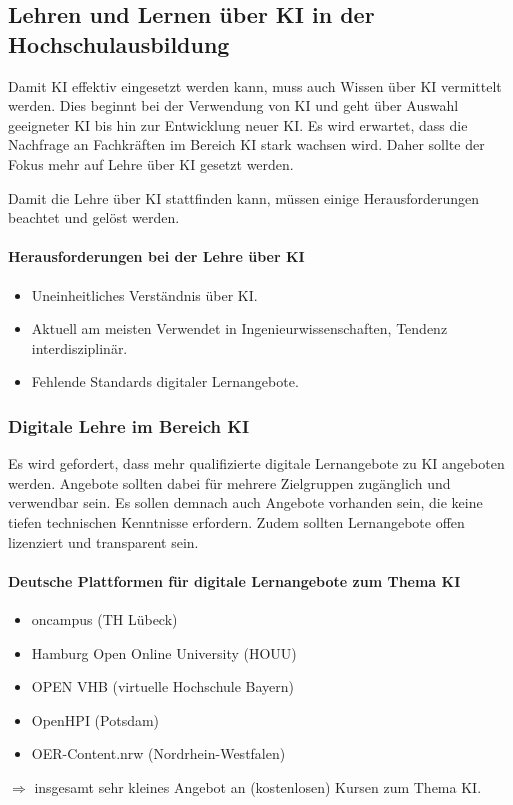 \subsection{Lehren und Lernen über KI in der Hochschulausbildung}
Damit KI effektiv eingesetzt werden kann, muss auch Wissen über KI vermittelt werden. Dies beginnt bei der Verwendung von KI und geht über Auswahl geeigneter KI bis hin zur Entwicklung neuer KI. Es wird erwartet, dass die Nachfrage an Fachkräften im Bereich KI stark wachsen wird. Daher sollte der Fokus mehr auf Lehre über KI gesetzt werden.

Damit die Lehre über KI stattfinden kann, müssen einige Herausforderungen beachtet und gelöst werden.

\paragraph*{Herausforderungen bei der Lehre über KI}
\begin{itemize}
    \item Uneinheitliches Verständnis über KI.
    \item Aktuell am meisten Verwendet in Ingenieurwissenschaften, Tendenz interdisziplinär.
    \item Fehlende Standards digitaler Lernangebote.
\end{itemize}

\subsubsection*{Digitale Lehre im Bereich KI}
Es wird gefordert, dass mehr qualifizierte digitale Lernangebote zu KI angeboten werden. Angebote sollten dabei für mehrere Zielgruppen zugänglich und verwendbar sein. Es sollen demnach auch Angebote vorhanden sein, die keine tiefen technischen Kenntnisse erfordern. Zudem sollten Lernangebote offen lizenziert und transparent sein.

\paragraph*{Deutsche Plattformen für digitale Lernangebote zum Thema KI}
\begin{itemize}
    \item oncampus (TH Lübeck)
    \item Hamburg Open Online University (HOUU)
    \item OPEN VHB (virtuelle Hochschule Bayern)
    \item OpenHPI (Potsdam)
    \item OER-Content.nrw (Nordrhein-Westfalen)
\end{itemize}
$\Rightarrow$ insgesamt sehr kleines Angebot an (kostenlosen) Kursen zum Thema KI.

